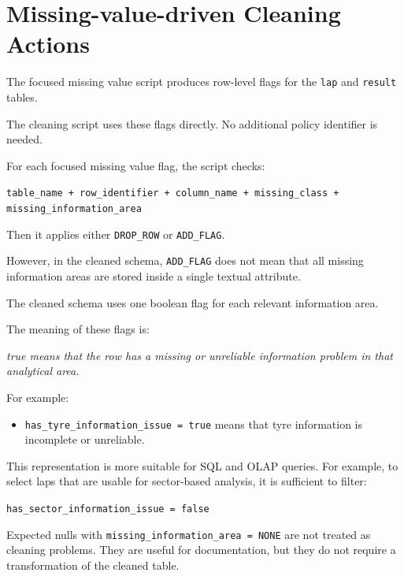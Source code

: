 \documentclass[a4paper,11pt]{article}
\begin{document}
	\section{Missing-value-driven Cleaning Actions}
	
	The focused missing value script produces row-level flags for the \texttt{lap}
	and \texttt{result} tables.
	
	The cleaning script uses these flags directly.
	No additional policy identifier is needed.
	
	For each focused missing value flag, the script checks:
	
	\begin{center}
		\texttt{table\_name + row\_identifier + column\_name + missing\_class + missing\_information\_area}
	\end{center}
	
	Then it applies either \texttt{DROP\_ROW} or \texttt{ADD\_FLAG}.
	
	However, in the cleaned schema, \texttt{ADD\_FLAG} does not mean that all missing
	information areas are stored inside a single textual attribute.
	
	The cleaned schema uses one boolean flag for each relevant
	information area.
	
	The meaning of these flags is:
	
	\begin{center}
		\textit{true means that the row has a missing or unreliable information problem
			in that analytical area.}
	\end{center}
	
	For example:
	
	\begin{itemize}[leftmargin=1.2cm]
		\item \texttt{has\_tyre\_information\_issue = true} means that tyre information is incomplete or unreliable.
	\end{itemize}
	
	This representation is more suitable for SQL and OLAP queries.
	For example, to select laps that are usable for sector-based analysis, it is sufficient
	to filter:
	
	\begin{center}
		\texttt{has\_sector\_information\_issue = false}
	\end{center}
	
	Expected nulls with \texttt{missing\_information\_area = NONE} are not treated as
	cleaning problems.
	They are useful for documentation, but they do not require a transformation of the
	cleaned table.
	
\end{document}
